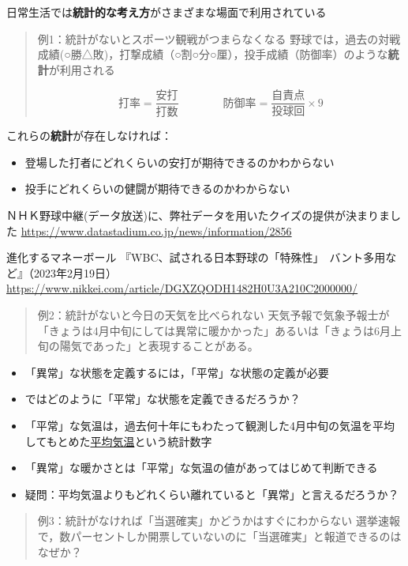 \documentclass[
]{book}
\providecommand{\tightlist}{%
  \setlength{\itemsep}{0pt}\setlength{\parskip}{0pt}}
\theoremstyle{definition}
\theoremstyle{definition}
\theoremstyle{definition}
\theoremstyle{definition}
\theoremstyle{remark}
\begin{document}
日常生活では\textbf{統計的な考え方}がさまざまな場面で利用されている

\begin{quote}
例1：統計がないとスポーツ観戦がつまらなくなる
野球では，過去の対戦成績(○勝△敗)，打撃成績（○割○分○厘），投手成績（防御率）のような\textbf{統計}が利用される

\[
\text{打率}=\frac{\text{安打}}{\text{打数}} \qquad\qquad
\text{防御率}=\frac{\text{自責点}}{\text{投球回}} \times 9
\]
\end{quote}

これらの\textbf{統計}が存在しなければ：

\begin{itemize}
\tightlist
\item
  登場した打者にどれくらいの安打が期待できるのかわからない
\item
  投手にどれくらいの健闘が期待できるのかわからない
\end{itemize}

ＮＨＫ野球中継(データ放送)に、弊社データを用いたクイズの提供が決まりました
\url{https://www.datastadium.co.jp/news/information/2856}

進化するマネーボール 『WBC、試される日本野球の「特殊性」　バント多用など』（2023年2月19日）
\url{https://www.nikkei.com/article/DGXZQODH1482H0U3A210C2000000/}

\begin{quote}
例2：統計がないと今日の天気を比べられない
天気予報で気象予報士が「きょうは4月中旬にしては異常に暖かかった」あるいは「きょうは6月上旬の陽気であった」と表現することがある。
\end{quote}

\begin{itemize}
\tightlist
\item
  「異常」な状態を定義するには，「平常」な状態の定義が必要
\item
  ではどのように「平常」な状態を定義できるだろうか？
\item
  「平常」な気温は，過去何十年にもわたって観測した4月中旬の気温を平均してもとめた\underline{平均気温}という統計数字
\item
  「異常」な暖かさとは「平常」な気温の値があってはじめて判断できる
\item
  疑問：平均気温よりもどれくらい離れていると「異常」と言えるだろうか？
\end{itemize}

\begin{quote}
例3：統計がなければ「当選確実」かどうかはすぐにわからない
選挙速報で，数パーセントしか開票していないのに「当選確実」と報道できるのはなぜか？
\end{quote}
\end{document}
